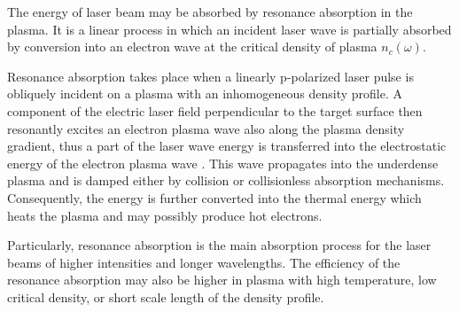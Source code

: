 The energy of laser beam may be absorbed by resonance absorption in the plasma. It is a linear process in which an incident laser wave is partially absorbed by conversion into an electron wave at the critical density of plasma $ n_c (\omega) $.

Resonance absorption takes place when a linearly p-polarized laser pulse is obliquely incident on a plasma with an inhomogeneous density profile. A component of the electric laser field perpendicular to the target surface then resonantly excites an electron plasma wave also along the plasma density gradient, thus a part of the laser wave energy is transferred into the electrostatic energy of the electron plasma wave \cite{eliezer}. This wave propagates into the underdense plasma and is damped either by collision or collisionless absorption mechanisms. Consequently, the energy is further converted into the thermal energy which heats the plasma and may possibly produce hot electrons.

Particularly, resonance absorption is the main absorption process for the laser beams of higher intensities and longer wavelengths. The efficiency of the resonance absorption may also be higher in plasma with high temperature, low critical density, or short scale length of the density profile.
